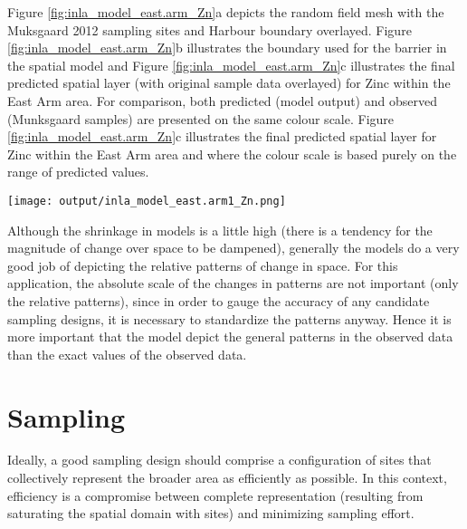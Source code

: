 \documentclass[a4paper]{article}
\let\origfigure=\figure
\let\endorigfigure=\endfigure
\renewenvironment{figure}[1][]{%
   \origfigure[H]
}{%
   \endorigfigure
}
\begin{document}
Figure \ref{fig:inla_model_east.arm_Zn}a depicts the random field mesh
with the Muksgaard 2012 sampling sites and Harbour boundary overlayed.
Figure \ref{fig:inla_model_east.arm_Zn}b illustrates the boundary used
for the barrier in the spatial model and Figure
\ref{fig:inla_model_east.arm_Zn}c illustrates the final predicted
spatial layer (with original sample data overlayed) for Zinc within the
East Arm area. For comparison, both predicted (model output) and
observed (Munksgaard samples) are presented on the same colour scale.
Figure \ref{fig:inla_model_east.arm_Zn}c illustrates the final predicted
spatial layer for Zinc within the East Arm area and where the colour
scale is based purely on the range of predicted values.

\begin{figure}
\centering\scriptsize
\texttt{[image: output/inla\_model\_east.arm1\_Zn.png]}
\caption{Integrated Nested Laplace Approximation (INLA) barrier spatial
modelling of Zinc. The diagram illustrates a) the mesh, b) the barrier
mask, c) the resulting predicted 2D surface (and observed training data
as points) and d) the resulting predicted 2D surface scaled to the range
of predictions.\label{fig:inla_model_east.arm_Zn}}
\end{figure}

Although the shrinkage in models is a little high (there is a tendency
for the magnitude of change over space to be dampened), generally the
models do a very good job of depicting the relative patterns of change
in space. For this application, the absolute scale of the changes in
patterns are not important (only the relative patterns), since in order
to gauge the accuracy of any candidate sampling designs, it is necessary
to standardize the patterns anyway. Hence it is more important that the
model depict the general patterns in the observed data than the exact
values of the observed data.

\clearpage

\hypertarget{sampling}{%
\section{Sampling}\label{sampling}}

Ideally, a good sampling design should comprise a configuration of sites
that collectively represent the broader area as efficiently as possible.
In this context, efficiency is a compromise between complete
representation (resulting from saturating the spatial domain with sites)
and minimizing sampling effort.
\end{document}
